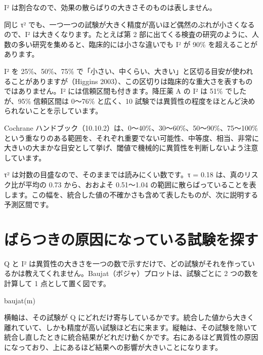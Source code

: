I² は割合なので、効果の散らばりの大きさそのものは表しません。

\begin{hattenbox}
同じ τ² でも、一つ一つの試験が大きく精度が高いほど偶然のぶれが小さくなるので、I² は大きくなります。たとえば第 2 部に出てくる検査の研究のように、人数の多い研究を集めると、臨床的には小さな違いでも I² が 90\% を超えることがあります。
\end{hattenbox}

I² を 25\%、50\%、75\% で「小さい、中くらい、大きい」と区切る目安が使われることがありますが（Higgins 2003）、この区切りは臨床的な重大さを表すものではありません。I² には信頼区間も付きます。降圧薬 A の I² は 51\% でしたが、95\% 信頼区間は 0〜76\% と広く、10 試験では異質性の程度をほとんど決められないことを示しています。

\begin{hattenbox}
Cochrane ハンドブック（10.10.2）は、0〜40\%、30〜60\%、50〜90\%、75〜100\% という重なりのある範囲を、それぞれ重要でない可能性、中等度、相当、非常に大きいの大まかな目安として挙げ、閾値で機械的に異質性を判断しないよう注意しています。
\end{hattenbox}

τ² は対数の目盛なので、そのままでは読みにくい数です。τ = 0.18 は、真のリスク比が平均の 0.73 から、おおよそ 0.51〜1.04 の範囲に散らばっていることを表します。この幅を、統合した値の不確かさも含めて表したものが、次に説明する予測区間です。

\section{\hatten ばらつきの原因になっている試験を探す}
\label{sec:06-2}

Q と I² は異質性の大きさを一つの数で示すだけで、どの試験がそれを作っているかは教えてくれません。Baujat（ボジャ）プロットは、試験ごとに 2 つの数を計算して 1 点として置く図です。

\begin{rcode}
baujat(m)
\end{rcode}


横軸は、その試験が Q にどれだけ寄与しているかです。統合した値から大きく離れていて、しかも精度が高い試験ほど右に来ます。縦軸は、その試験を除いて統合し直したときに統合結果がどれだけ動くかです。右にあるほど異質性の原因になっており、上にあるほど結果への影響が大きいことになります。

